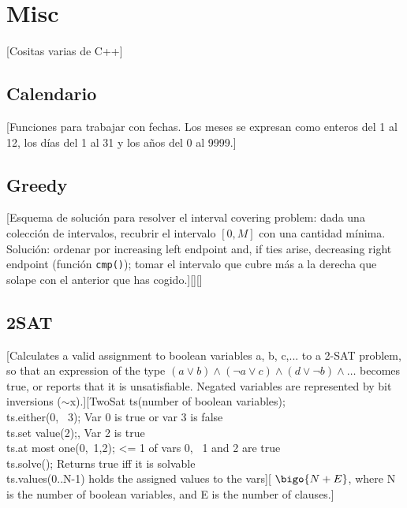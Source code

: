 \chapter{Misc}

%
	[Cositas varias de C++]

\section{Calendario}
		[Funciones para trabajar con fechas. Los meses se expresan como enteros del 1 al 12, los días del 1 al 31 y los años del 0 al 9999.]
		
\section{Greedy}
		[Esquema de solución para resolver el interval covering problem: dada una colección de intervalos, recubrir el intervalo $[0, M]$ con una cantidad mínima. Solución: ordenar por increasing left endpoint and, if ties arise, decreasing right endpoint (función \texttt{cmp()}); tomar el intervalo que cubre más a la derecha que solape con el anterior que has cogido.][][]
		
\section {2SAT}
		[Calculates a valid assignment to boolean variables a, b, c,... to a
		2-SAT problem, so that an expression
		of the type $(a \lor b)\land(\neg a\lor c)\land(d\lor \neg b)\land \ldots$
		becomes true, or reports that it is unsatisfiable. Negated variables are
		represented by bit inversions ($\sim$x).][TwoSat ts(number of boolean variables); \\ 
		ts.either(0, ~3);  Var 0 is true or var 3 is false \\
		ts.set value(2);, Var 2 is true \\
		ts.at most one({0,~1,2});  <= 1 of vars 0, ~1 and 2 are true \\
		ts.solve();  Returns true iff it is solvable \\
		ts.values(0..N-1) holds the assigned values to the vars][
		$\bigo{N + E}$, where N is the number of boolean variables, and E is the number of clauses.]